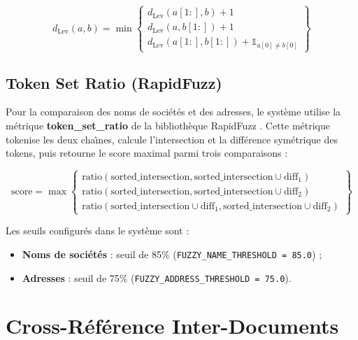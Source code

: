 \begin{equation}
d_{\text{Lev}}(a, b) = \min \left\{
\begin{array}{l}
d_{\text{Lev}}(a[1:], b) + 1 \\
d_{\text{Lev}}(a, b[1:]) + 1 \\
d_{\text{Lev}}(a[1:], b[1:]) + \mathbb{1}_{a[0] \neq b[0]}
\end{array}
\right\}
\label{eq:levenshtein}
\end{equation}

\subsection{Token Set Ratio (RapidFuzz)}

Pour la comparaison des noms de soci\'{e}t\'{e}s et des adresses, le syst\`{e}me utilise la m\'{e}trique \textbf{token\_set\_ratio} de la biblioth\`{e}que RapidFuzz \cite{rapidfuzz-doc}. Cette m\'{e}trique tokenise les deux cha\^{\i}nes, calcule l'intersection et la diff\'{e}rence sym\'{e}trique des tokens, puis retourne le score maximal parmi trois comparaisons :

\begin{equation}
\text{score} = \max \left\{
\begin{array}{l}
\text{ratio}(\text{sorted\_intersection}, \text{sorted\_intersection} \cup \text{diff}_1) \\
\text{ratio}(\text{sorted\_intersection}, \text{sorted\_intersection} \cup \text{diff}_2) \\
\text{ratio}(\text{sorted\_intersection} \cup \text{diff}_1, \text{sorted\_intersection} \cup \text{diff}_2)
\end{array}
\right\}
\label{eq:token-set-ratio}
\end{equation}

Les seuils configur\'{e}s dans le syst\`{e}me sont :
\begin{itemize}[leftmargin=*, itemsep=4pt]
    \item \textbf{Noms de soci\'{e}t\'{e}s} : seuil de 85\% (\texttt{FUZZY\_NAME\_THRESHOLD = 85.0}) ;
    \item \textbf{Adresses} : seuil de 75\% (\texttt{FUZZY\_ADDRESS\_THRESHOLD = 75.0}).
\end{itemize}

\section{Cross-R\'{e}f\'{e}rence Inter-Documents}

